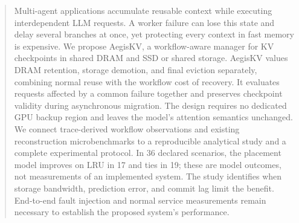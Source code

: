 \begin{abstract}
Multi-agent applications accumulate reusable context while executing
interdependent LLM requests. A worker failure can lose this state and delay
several branches at once, yet protecting every context in fast memory is
expensive. We propose AegisKV, a workflow-aware manager for KV checkpoints
in shared DRAM and SSD or shared storage. AegisKV values DRAM retention,
storage demotion, and final eviction separately, combining normal reuse
with the workflow cost of recovery. It evaluates requests affected by a
common failure together and preserves checkpoint validity during asynchronous
migration. The design requires no dedicated GPU backup region and leaves
the model's attention semantics unchanged. We connect trace-derived
workflow observations and existing reconstruction microbenchmarks to a
reproducible analytical study and a complete experimental protocol.
In 36 declared scenarios, the placement model improves on LRU in 17 and
ties in 19; these are model outcomes, not measurements of an implemented
system. The study identifies when storage bandwidth, prediction error,
and commit lag limit the benefit. End-to-end fault injection and normal
service measurements remain necessary to establish the proposed system's
performance.
\end{abstract}
